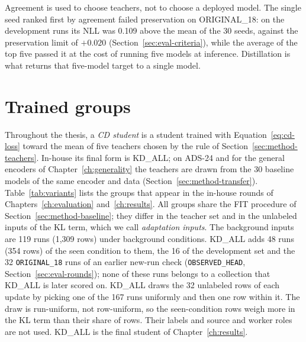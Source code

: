 Agreement is used to choose teachers, not to choose a deployed model.
The single seed ranked first by agreement failed preservation on
ORIGINAL\_18: on the development runs its NLL was 0.109 above the mean of
the 30 seeds, against the preservation limit of $+0.020$
(Section~\ref{sec:eval-criteria}), while
the average of the top five passed it at the cost of running five models
at inference. Distillation is what returns that five-model target to a
single model.

\section{Trained groups}
\label{sec:method-variants}

Throughout the thesis, a \emph{CD student} is a student trained with
Equation~\ref{eq:cd-loss} toward the mean of five teachers chosen by
the rule of Section~\ref{sec:method-teachers}. In-house its final form
is KD\_ALL; on ADS-24 and for the general encoders of
Chapter~\ref{ch:generality} the teachers are drawn from the 30 baseline
models of the same encoder and data (Section~\ref{sec:method-transfer}).
Table~\ref{tab:variants} lists the groups that appear in the in-house
rounds of Chapters~\ref{ch:evaluation} and~\ref{ch:results}. All groups
share the FIT procedure of Section~\ref{sec:method-baseline}; they differ
in the teacher set and in the unlabeled inputs of the KL term, which we
call \emph{adaptation inputs}. The
background inputs are 119 runs (1,309 rows) under background conditions.
KD\_ALL adds 48 runs (354 rows) of the seen condition to them, the 16
of the development set and the 32 \texttt{ORIGINAL\_18} runs of an
earlier new-run check (\texttt{OBSERVED\_HEAD},
Section~\ref{sec:eval-rounds}); none of these runs belongs to a
collection that KD\_ALL is later scored on. KD\_ALL
draws the 32 unlabeled rows of each update by picking one of the 167
runs uniformly and then one row within it. The draw is run-uniform, not
row-uniform, so the seen-condition rows weigh more in the KL term than
their share of rows. Their labels and source and worker roles are not
used. KD\_ALL is the
final student of Chapter~\ref{ch:results}.

